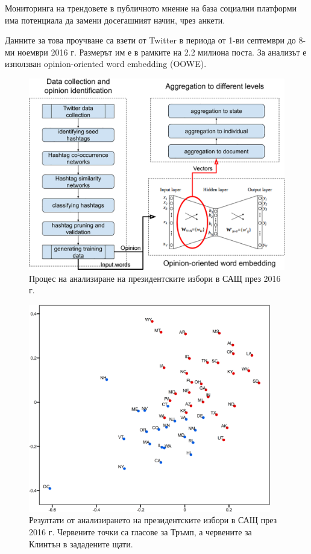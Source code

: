 \documentclass{article}
\begin{document}
Мониторинга на трендовете в публичното мнение на база социални платформи има потенциала да замени досегашният начин,
чрез анкети.

Данните за това проучване са взети от Twitter в периода от 1-ви септември до 8-ми ноември 2016 г. Размерът им е в
рамките на 2.2 милиона поста. За анализът е използван opinion-oriented word embedding (OOWE). \cite{us-election-2016}

\begin{figure}[H]
  \centering
  \captionsetup{justification=centering}
  \includegraphics{chapter-02/us-election-2016.png}
  \caption{Процес на анализиране на президентските избори в САЩ през 2016 г.}
\end{figure}

\begin{figure}[H]
  \centering
  \captionsetup{justification=centering}
  \includegraphics[width=400px, keepaspectratio]{chapter-02/us-election-2016-results.png}
  \caption{Резултати от анализирането на президентските избори в САЩ през 2016 г. Червените точки са гласове за Тръмп,
      а червените за Клинтън в зададените щати.}
\end{figure}
\end{document}
